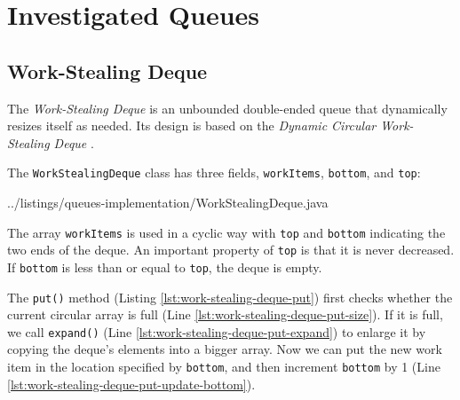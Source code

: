 
\chapter{Investigated Queues}
\label{chap:queues-implementation}


\section{Work-Stealing Deque}
\label{sec:queues-implementation-ws-deque}

The \emph{Work-Stealing Deque} is an unbounded double-ended queue that
dynamically resizes itself as needed. Its design is based on the
\emph{Dynamic Circular Work-Stealing Deque} \cite{Chase2005, Lev2005}.

The \lstinline!WorkStealingDeque! class has three fields,
\lstinline!workItems!, \lstinline!bottom!, and \lstinline!top!:


{
    ../listings/queues-implementation/WorkStealingDeque.java
}

The array \lstinline!workItems! is used in a cyclic way with
\lstinline!top! and \lstinline!bottom! indicating the two ends of the
deque. An important property of \lstinline!top! is that it is never
decreased. If \lstinline!bottom! is less than or equal to
\lstinline!top!, the deque is empty.

The \lstinline!put()! method (Listing
\ref{lst:work-stealing-deque-put}) first checks whether the current
circular array is full (Line
\ref{lst:work-stealing-deque-put-size}). If it is full, we call
\lstinline!expand()! (Line \ref{lst:work-stealing-deque-put-expand})
to enlarge it by copying the deque's elements into a bigger array. Now
we can put the new work item in the location specified by
\lstinline!bottom!, and then increment \lstinline!bottom! by 1 (Line
\ref{lst:work-stealing-deque-put-update-bottom}).

